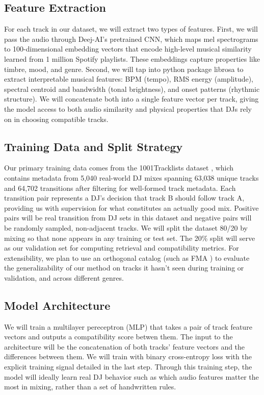 \documentclass[10pt]{article}
\begin{document}
\subsection*{Feature Extraction}

For each track in our dataset, we will extract two types of features. First, we will pass the audio through Deej-AI's \cite{deejai} pretrained CNN, which maps mel spectrograms to 100-dimensional embedding vectors that encode high-level musical similarity learned from 1 million Spotify playlists. These embeddings capture properties like timbre, mood, and genre. Second, we will tap into  python package librosa to extract interpretable musical features: BPM (tempo), RMS energy (amplitude), spectral centroid and bandwidth (tonal brightness), and onset patterns (rhythmic structure). We will concatenate both into a single feature vector per track, giving the model access to both audio similarity and physical properties that DJs rely on in choosing compatible tracks.

\subsection*{Training Data and Split Strategy}

Our primary training data comes from the 1001Tracklists dataset \cite{1001tracklists}, which contains metadata from 5,040 real-world DJ mixes spanning 63,038 unique tracks and 64,702 transitions after filtering for well-formed track metadata. Each transition pair represents a DJ's decision that track B should follow track A, providing us with supervision for what constitutes an actually good mix. Positive pairs will be real transition from DJ sets in this dataset and negative pairs will be randomly sampled, non-adjacent tracks. We will split the dataset 80/20 by mixing so that none appears in any training or test set. The 20\% split will serve as our validation set for computing retrieval and compatibility metrics. For extensibility, we plan to use an orthogonal catalog (such as FMA \cite{fma}) to evaluate the generalizability of our method on tracks it hasn't seen during training or validation, and across different genres.

\subsection*{Model Architecture}

We will train a multilayer pereceptron (MLP) that takes a pair of track feature vectors and outputs a compatibility score betwen them. The input to the architecture will be the concatenation of both tracks' feature vectors and the differences between them. We will train with binary cross-entropy loss with the explicit training signal detailed in the last step. Through this training step, the model will ideally learn real DJ behavior such as which audio features matter the most in mixing, rather than a set of handwritten rules.
\end{document}
